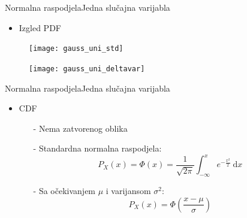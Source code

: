 \documentclass[aspectratio=169]{beamer}
\begin{document}
  \begin{frame}{Normalna raspodjela}{Jedna slučajna varijabla}
    \vspace{.3cm}
    \begin{itemize} \item Izgled PDF \end{itemize}
    \vspace{.3cm}
    \begin{figure}[ht]
      \begin{minipage}[b]{0.45\linewidth}
        \centering
        \texttt{[image: gauss\_uni\_std]}
        \caption{$\mu=0, \sigma=1$}
      \end{minipage}
      \hspace{0.5cm}
      \begin{minipage}[b]{0.45\linewidth}
        \centering
        \texttt{[image: gauss\_uni\_deltavar]}
        \caption{$\mu=-2, \sigma=2$}
      \end{minipage}
     \caption
     \hfill
    \end{figure}
  \end{frame}
  
  \begin{frame}{Normalna raspodjela}{Jedna slučajna varijabla}
    \begin{itemize}
      \item CDF
        \begin{itemize}
          \item[-] Nema zatvorenog oblika
          \item[-] Standardna normalna raspodjela:
            $$P_X(x) = \Phi(x) = \frac{1}{\sqrt{2\pi}} \int_{-\infty}^{x}
            e^{-\frac{x^2}{2}} \ \mathrm dx$$
          \item[-] Sa očekivanjem $\mu$ i varijansom $\sigma^2$:
            $$P_X(x) = \Phi\left(\frac{x-\mu}{\sigma}\right)$$
        \end{itemize}
    \end{itemize}
  \end{frame}
\end{document}

